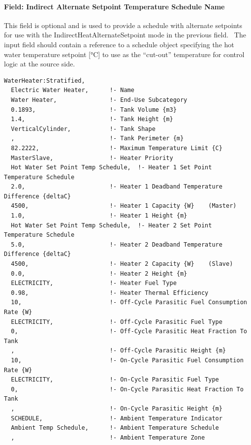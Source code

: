 \paragraph{Field: Indirect Alternate Setpoint Temperature Schedule Name}\label{field-indirect-alternate-setpoint-temperature-schedule-name-1}

This field is optional and is used to provide a schedule with alternate setpoints for use with the IndirectHeatAlternateSetpoint mode in the previous field.~ The input field should contain a reference to a schedule object specifying the hot water temperature setpoint {[}°C{]} to use as the ``cut-out'' temperature for control logic at the source side.

\begin{lstlisting}
WaterHeater:Stratified,
  Electric Water Heater,      !- Name
  Water Heater,               !- End-Use Subcategory
  0.1893,                     !- Tank Volume {m3}
  1.4,                        !- Tank Height {m}
  VerticalCylinder,           !- Tank Shape
  ,                           !- Tank Perimeter {m}
  82.2222,                    !- Maximum Temperature Limit {C}
  MasterSlave,                !- Heater Priority
  Hot Water Set Point Temp Schedule,  !- Heater 1 Set Point Temperature Schedule
  2.0,                        !- Heater 1 Deadband Temperature Difference {deltaC}
  4500,                       !- Heater 1 Capacity {W}    (Master)
  1.0,                        !- Heater 1 Height {m}
  Hot Water Set Point Temp Schedule,  !- Heater 2 Set Point Temperature Schedule
  5.0,                        !- Heater 2 Deadband Temperature Difference {deltaC}
  4500,                       !- Heater 2 Capacity {W}    (Slave)
  0.0,                        !- Heater 2 Height {m}
  ELECTRICITY,                !- Heater Fuel Type
  0.98,                       !- Heater Thermal Efficiency
  10,                         !- Off-Cycle Parasitic Fuel Consumption Rate {W}
  ELECTRICITY,                !- Off-Cycle Parasitic Fuel Type
  0,                          !- Off-Cycle Parasitic Heat Fraction To Tank
  ,                           !- Off-Cycle Parasitic Height {m}
  10,                         !- On-Cycle Parasitic Fuel Consumption Rate {W}
  ELECTRICITY,                !- On-Cycle Parasitic Fuel Type
  0,                          !- On-Cycle Parasitic Heat Fraction To Tank
  ,                           !- On-Cycle Parasitic Height {m}
  SCHEDULE,                   !- Ambient Temperature Indicator
  Ambient Temp Schedule,      !- Ambient Temperature Schedule
  ,                           !- Ambient Temperature Zone

\end{lstlisting}
